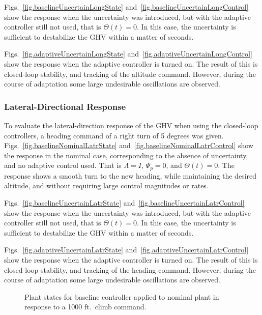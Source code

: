 Figs.~\ref{fig.baselineUncertainLongState} and~\ref{fig.baselineUncertainLongControl} show the response when the uncertainty was introduced, but with the adaptive controller still not used, that is $\Theta(t)=0$.
In this case, the uncertainty is sufficient to destabilize the GHV within a matter of seconds.

Figs.~\ref{fig.adaptiveUncertainLongState} and~\ref{fig.adaptiveUncertainLongControl} show the response when the adaptive controller is turned on. The result of this is closed-loop stability, and tracking of the altitude command.
However, during the course of adaptation some large undesirable oscillations are observed.

\subsubsection{Lateral-Directional Response}

To evaluate the lateral-direction response of the GHV when using the closed-loop controllers, a heading command of a right turn of 5 degrees was given.
Figs.~\ref{fig.baselineNominalLatrState} and~\ref{fig.baselineNominalLatrControl} show the response in the nominal case, corresponding to the absence of uncertainty, and no adaptive control used.
That is $\Lambda=I$, $\Psi_{p}=0$, and $\Theta(t)=0$.
The response shows a smooth turn to the new heading, while maintaining the desired altitude, and without requiring large control magnitudes or rates.

Figs.~\ref{fig.baselineUncertainLatrState} and~\ref{fig.baselineUncertainLatrControl} show the response when the uncertainty was introduced, but with the adaptive controller still not used, that is $\Theta(t)=0$.
In this case, the uncertainty is sufficient to destabilize the GHV within a matter of seconds.

Figs.~\ref{fig.adaptiveUncertainLatrState} and~\ref{fig.adaptiveUncertainLatrControl} show the response when the adaptive controller is turned on.
The result of this is closed-loop stability, and tracking of the heading command.
However, during the course of adaptation some large undesirable oscillations are observed.

\newpage
\begin{figure}[H]
  \hspace{-0.5in}
  \noindent{}
  \vspace{-1.0in}
  \caption{Plant states for baseline controller applied to nominal plant in response to a 1000 ft.\ climb command.\label{fig.baselineNominalLongState}}
\end{figure}

